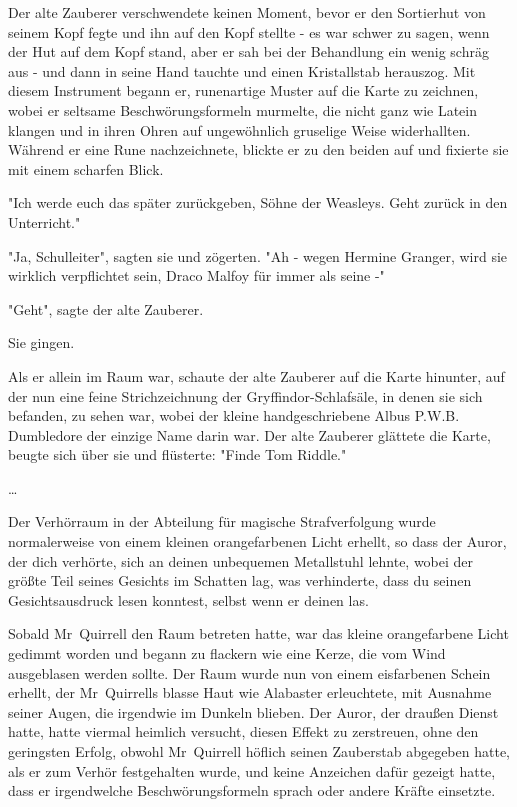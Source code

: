 {Der alte Zauberer verschwendete keinen Moment, bevor er den Sortierhut von seinem Kopf fegte und ihn auf den Kopf stellte - es war schwer zu sagen, wenn der Hut auf dem Kopf stand, aber er sah bei der Behandlung ein wenig schräg aus - und dann in seine Hand tauchte und einen Kristallstab herauszog. Mit diesem Instrument begann er, runenartige Muster auf die Karte zu zeichnen, wobei er seltsame Beschwörungsformeln murmelte, die nicht ganz wie Latein klangen und in ihren Ohren auf ungewöhnlich gruselige Weise widerhallten. Während er eine Rune nachzeichnete, blickte er zu den beiden auf und fixierte sie mit einem scharfen Blick.

"Ich werde euch das später zurückgeben, Söhne der Weasleys. Geht zurück in den Unterricht."

"Ja, Schulleiter", sagten sie und zögerten. "Ah - wegen Hermine Granger, wird sie wirklich verpflichtet sein, Draco Malfoy für immer als seine -"

"Geht", sagte der alte Zauberer.

Sie gingen.

Als er allein im Raum war, schaute der alte Zauberer auf die Karte hinunter, auf der nun eine feine Strichzeichnung der Gryffindor-Schlafsäle, in denen sie sich befanden, zu sehen war, wobei der kleine handgeschriebene Albus P.W.B. Dumbledore der einzige Name darin war. Der alte Zauberer glättete die Karte, beugte sich über sie und flüsterte: "Finde Tom Riddle."

…

Der Verhörraum in der Abteilung für magische Strafverfolgung wurde normalerweise von einem kleinen orangefarbenen Licht erhellt, so dass der Auror, der dich verhörte, sich an deinen unbequemen Metallstuhl lehnte, wobei der größte Teil seines Gesichts im Schatten lag, was verhinderte, dass du seinen Gesichtsausdruck lesen konntest, selbst wenn er deinen las.

Sobald Mr~Quirrell den Raum betreten hatte, war das kleine orangefarbene Licht gedimmt worden und begann zu flackern wie eine Kerze, die vom Wind ausgeblasen werden sollte. Der Raum wurde nun von einem eisfarbenen Schein erhellt, der Mr~Quirrells blasse Haut wie Alabaster erleuchtete, mit Ausnahme seiner Augen, die irgendwie im Dunkeln blieben. Der Auror, der draußen Dienst hatte, hatte viermal heimlich versucht, diesen Effekt zu zerstreuen, ohne den geringsten Erfolg, obwohl Mr~Quirrell höflich seinen Zauberstab abgegeben hatte, als er zum Verhör festgehalten wurde, und keine Anzeichen dafür gezeigt hatte, dass er irgendwelche Beschwörungsformeln sprach oder andere Kräfte einsetzte.

}
